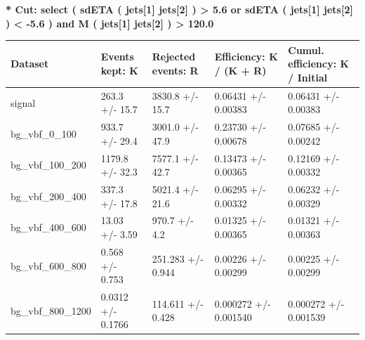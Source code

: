 \documentclass[a4paper, 10pt]{article}
\begin{document}
\textbf{* Cut: select ( sdETA ( jets[1] jets[2] ) > 5.6 or sdETA ( jets[1] jets[2] ) < -5.6 ) and M ( jets[1] jets[2] ) > 120.0}\\
   \begin{table}[H]
  \begin{center}
    \begin{tabular}{|m{20.0mm}|m{27.0mm}|m{27.0mm}|m{33.0mm}|m{32.0mm}|}
      \hline
      {\cellcolor{yellow}         Dataset}& {\cellcolor{yellow}         Events kept:
          K}& {\cellcolor{yellow}         Rejected events:
          R}& {\cellcolor{yellow}         Efficiency:
          K /\- (K + R)}& {\cellcolor{yellow}         Cumul. efficiency:
          K /\- Initial}\\
      \hline
      {\cellcolor{white}         signal}& {\cellcolor{white}         263.3 +/\-- 15.7}& {\cellcolor{white}         3830.8 +/\-- 15.7}& {\cellcolor{white}         0.06431 +/\-- 0.00383}& {\cellcolor{white}         0.06431 +/\-- 0.00383}\\
      \hline
      {\cellcolor{white}         bg\_vbf\_0\_100}& {\cellcolor{white}         933.7 +/\-- 29.4}& {\cellcolor{white}         3001.0 +/\-- 47.9}& {\cellcolor{white}         0.23730 +/\-- 0.00678}& {\cellcolor{white}         0.07685 +/\-- 0.00242}\\
      \hline
      {\cellcolor{white}         bg\_vbf\_100\_200}& {\cellcolor{white}         1179.8 +/\-- 32.3}& {\cellcolor{white}         7577.1 +/\-- 42.7}& {\cellcolor{white}         0.13473 +/\-- 0.00365}& {\cellcolor{white}         0.12169 +/\-- 0.00332}\\
      \hline
      {\cellcolor{white}         bg\_vbf\_200\_400}& {\cellcolor{white}         337.3 +/\-- 17.8}& {\cellcolor{white}         5021.4 +/\-- 21.6}& {\cellcolor{white}         0.06295 +/\-- 0.00332}& {\cellcolor{white}         0.06232 +/\-- 0.00329}\\
      \hline
      {\cellcolor{white}         bg\_vbf\_400\_600}& {\cellcolor{white}         13.03 +/\-- 3.59}& {\cellcolor{white}         970.7 +/\-- 4.2}& {\cellcolor{white}         0.01325 +/\-- 0.00365}& {\cellcolor{white}         0.01321 +/\-- 0.00363}\\
      \hline
      {\cellcolor{white}         bg\_vbf\_600\_800}& {\cellcolor{white}         0.568 +/\-- 0.753}& {\cellcolor{white}         251.283 +/\-- 0.944}& {\cellcolor{white}         0.00226 +/\-- 0.00299}& {\cellcolor{white}         0.00225 +/\-- 0.00299}\\
      \hline
      {\cellcolor{white}         bg\_vbf\_800\_1200}& {\cellcolor{white}         0.0312 +/\-- 0.1766}& {\cellcolor{white}         114.611 +/\-- 0.428}& {\cellcolor{white}         0.000272 +/\-- 0.001540}& {\cellcolor{white}         0.000272 +/\-- 0.001539}\\

\end{tabular}
\end{center}
\end{table}
\end{document}
